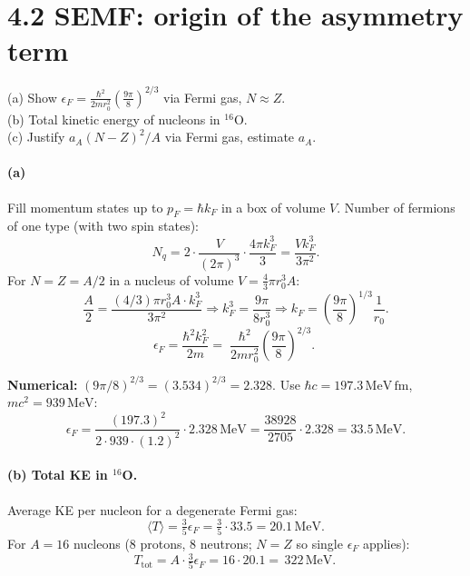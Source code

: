\documentclass[11pt]{article}
\newcommand{\Q}[1]{\begin{question}#1\end{question}}
\newcommand{\fm}{\,\mathrm{fm}}
\newcommand{\MeV}{\,\mathrm{MeV}}
\begin{document}
\section*{4.2 \quad SEMF: origin of the asymmetry term}

\Q{(a) Show $\epsilon_F=\frac{\hbar^{2}}{2 m r_0^{2}}\!\left(\frac{9\pi}{8}\right)^{2/3}$ via Fermi gas, $N\approx Z$.\\
(b) Total kinetic energy of nucleons in $^{16}\mathrm{O}$.\\
(c) Justify $a_A(N-Z)^{2}/A$ via Fermi gas, estimate $a_A$.}

\paragraph{(a)} Fill momentum states up to $p_F=\hbar k_F$ in a box of volume $V$. Number of fermions of one type (with two spin states):
\[
N_q = 2\cdot \frac{V}{(2\pi)^{3}}\cdot\frac{4\pi k_F^{3}}{3} = \frac{V k_F^{3}}{3\pi^{2}}.
\]
For $N=Z=A/2$ in a nucleus of volume $V=\tfrac{4}{3}\pi r_0^{3}A$:
\[
\frac{A}{2}=\frac{(4/3)\pi r_0^{3}A\cdot k_F^{3}}{3\pi^{2}}\Rightarrow k_F^{3}=\frac{9\pi}{8 r_0^{3}}\Rightarrow k_F=\!\left(\frac{9\pi}{8}\right)^{1/3}\!\frac{1}{r_0}.
\]
\[
\epsilon_F=\frac{\hbar^{2}k_F^{2}}{2 m}=\boxed{\;\frac{\hbar^{2}}{2 m r_0^{2}}\!\left(\frac{9\pi}{8}\right)^{2/3}.\;}
\]

\textbf{Numerical:} $(9\pi/8)^{2/3}=(3.534)^{2/3}=2.328$. Use $\hbar c=197.3\MeV\fm$, $m c^{2}=939\MeV$:
\[
\epsilon_F=\frac{(197.3)^{2}}{2\cdot 939\cdot(1.2)^{2}}\cdot 2.328\MeV=\frac{38928}{2705}\cdot 2.328=33.5\MeV.
\]

\paragraph{(b) Total KE in $^{16}$O.} Average KE per nucleon for a degenerate Fermi gas:
\[
\langle T\rangle=\tfrac{3}{5}\epsilon_F=\tfrac{3}{5}\cdot 33.5=20.1\MeV.
\]
For $A=16$ nucleons (8 protons, 8 neutrons; $N=Z$ so single $\epsilon_F$ applies):
\[
T_\mathrm{tot}=A\cdot\tfrac{3}{5}\epsilon_F=16\cdot 20.1=\boxed{\,322\MeV.\,}
\]
\end{document}
